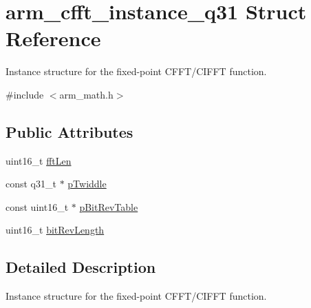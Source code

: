 \hypertarget{structarm__cfft__instance__q31}{\section{arm\-\_\-cfft\-\_\-instance\-\_\-q31 Struct Reference}
\label{structarm__cfft__instance__q31}
}


Instance structure for the fixed-\/point C\-F\-F\-T/\-C\-I\-F\-F\-T function.  




{\ttfamily \#include $<$arm\-\_\-math.\-h$>$}

\subsection*{Public Attributes}
\begin{DoxyCompactItemize}
\item 
uint16\-\_\-t \hyperlink{structarm__cfft__instance__q31_a4406f23e8fd0bff8d555225612e2a2a8}{fft\-Len}
\item 
const q31\-\_\-t $\ast$ \hyperlink{structarm__cfft__instance__q31_af751114feb91de3ace8600e91bdd0872}{p\-Twiddle}
\item 
const uint16\-\_\-t $\ast$ \hyperlink{structarm__cfft__instance__q31_a8a464461649f023325ced1e10470f5d0}{p\-Bit\-Rev\-Table}
\item 
uint16\-\_\-t \hyperlink{structarm__cfft__instance__q31_a2250fa6b8fe73292c5418c50c0549f87}{bit\-Rev\-Length}
\end{DoxyCompactItemize}


\subsection{Detailed Description}
Instance structure for the fixed-\/point C\-F\-F\-T/\-C\-I\-F\-F\-T function. 

